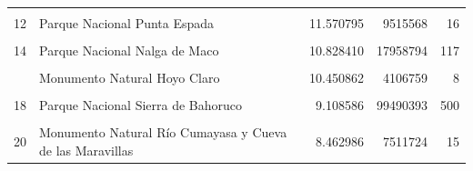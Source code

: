 \documentclass[10pt,landscape,a3paper]{article}
\begin{document}
\begin{table}[H]
\begin{tabular}[t]{llrrr}
\addlinespace
\cellcolor{lightgray}{11} & \cellcolor{lightgray}{Refugio de Vida Silvestre Cañón Río Gurabo} & \cellcolor{lightgray}{11.817495} & \cellcolor{lightgray}{3564134} & \cellcolor{lightgray}{8}\\
12 & Parque Nacional Punta Espada & 11.570795 & 9515568 & 16\\
\cellcolor{lightgray}{13} & \cellcolor{lightgray}{Via Panoramica Autovia Santo Domingo - Samana - Boulevar del Atlantico} & \cellcolor{lightgray}{11.542791} & \cellcolor{lightgray}{11922785} & \cellcolor{lightgray}{18}\\
14 & Parque Nacional Nalga de Maco & 10.828410 & 17958794 & 117\\
\cellcolor{lightgray}{15} & \cellcolor{lightgray}{Parque Nacional Cabo Cabrón} & \cellcolor{lightgray}{10.811425} & \cellcolor{lightgray}{3851405} & \cellcolor{lightgray}{8}\\
\addlinespace
16 & Monumento Natural Hoyo Claro & 10.450862 & 4106759 & 8\\
\cellcolor{lightgray}{17} & \cellcolor{lightgray}{Parque Nacional Manolo Tavarez Justo} & \cellcolor{lightgray}{9.878937} & \cellcolor{lightgray}{34746840} & \cellcolor{lightgray}{128}\\
18 & Parque Nacional Sierra de Bahoruco & 9.108586 & 99490393 & 500\\
\cellcolor{lightgray}{19} & \cellcolor{lightgray}{Reserva Forestal Las Matas} & \cellcolor{lightgray}{8.968713} & \cellcolor{lightgray}{4285024} & \cellcolor{lightgray}{15}\\
20 & Monumento Natural Río Cumayasa y Cueva de las Maravillas & 8.462986 & 7511724 & 15\\
\bottomrule
\end{tabular}
\end{table}
\end{document}
